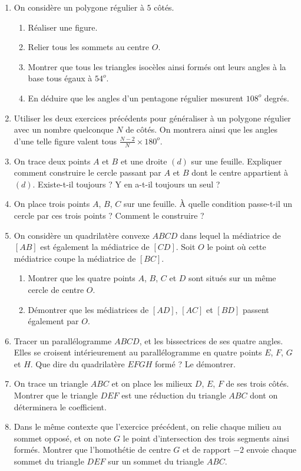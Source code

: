 \documentclass[14pt]{extreport}
\newcounter{n}
\theoremstyle{plain}
\begin{document}
\begin{enumerate}
 \item On considère un polygone régulier à $5$ côtés.
 \begin{enumerate}
 \item Réaliser une figure.
 \item Relier tous les sommets au centre $O$. 
 \item Montrer que tous les triangles isocèles ainsi formés ont leurs angles à la base tous égaux à $54^o$. 
 \item En déduire que les angles d'un pentagone régulier mesurent $108^o$ degrés.
\end{enumerate}   
\item Utiliser les deux exercices précédents pour généraliser à un polygone régulier avec un nombre quelconque $N$ de côtés. On montrera ainsi que les angles d'une telle figure valent tous $\frac{N-2}N\times 180^o$.
\item On trace deux points $A$ et $B$ et une droite $(d)$ sur une feuille. Expliquer comment construire le cercle passant par $A$ et $B$ dont le centre appartient à $(d)$. Existe-t-il toujours ? Y en a-t-il toujours un seul ?
\item On place trois points $A$, $B$, $C$ sur une feuille. À quelle condition passe-t-il un cercle par ces trois points ? Comment le construire ? 
\item On considère un quadrilatère convexe $ABCD$ dans lequel la médiatrice de 
$[AB]$ est également la médiatrice de $[CD]$. Soit $O$ le point où cette médiatrice coupe la médiatrice de $[BC]$. \begin{enumerate}
\item Montrer que les quatre points $A$, $B$, $C$ et $D$ sont situés sur un même cercle de centre $O$. 
\item Démontrer que les médiatrices de $[AD]$, $[AC]$ et $[BD]$ passent également par $O$. 
\end{enumerate}
\item Tracer un parallélogramme $ABCD$, et les bissectrices de ses quatre angles. Elles se croisent intérieurement au parallélogramme en quatre points $E$, $F$, $G$ et $H$. Que dire du quadrilatère $EFGH$ formé ? Le démontrer. 
\item On trace un triangle $ABC$ et on place les milieux $D$, $E$, $F$ de ses trois côtés. Montrer que le triangle $DEF$ est une réduction du triangle $ABC$ dont on déterminera le coefficient. 
\item Dans le même contexte que l'exercice précédent, on relie chaque milieu au sommet opposé, et on note $G$ le point d'intersection des trois segments ainsi formés. Montrer que l'homothétie de centre $G$ et de rapport $-2$ envoie chaque sommet du triangle $DEF$ sur un sommet du triangle $ABC$. 

\end{enumerate}
\end{document}
